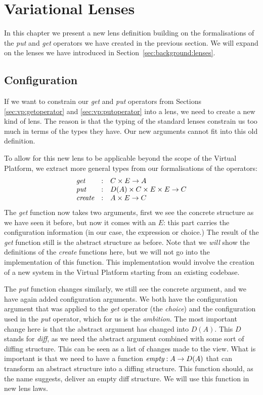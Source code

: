 \chapter{Variational Lenses}\label{sec:configlenses}
In this chapter we present a new lens definition building on the formalisations 
of the \emph{put} and \emph{get} operators we have created in the previous
section. We will expand on the lenses we have introduced in Section~\ref{sec:background:lenses}.

\section{Configuration}
If we want to constrain our \emph{get} and \emph{put} operators from
Sections \ref{sec:vp:getoperator} and \ref{sec:vp:putoperator} into a lens, we
need to create a new kind of lens. The reason is that the typing of the
standard lenses constrain us too much in terms of the types they have. Our
new arguments cannot fit into this old definition.

To allow for this new lens to be applicable beyond the scope of the Virtual
Platform, we extract more general types from our formalisations of the
operators:
\[
  \begin{array}{lll}
    \textit{get} & : & C \times E \rightarrow A \\
    \textit{put} & : & D(A) \times C \times E \times E \rightarrow C \\
    \textit{create} & : & A \times E \rightarrow C
  \end{array}
\]
The \emph{get} function now takes two arguments, first we see the concrete
structure as we have seen it before, but now it comes with an \(E\): this part
carries the configuration information (in our case, the expression or choice.)
The result of the \emph{get} function still is the abstract structure as before. Note
that we \emph{will} show the definitions of the \emph{create} functions here, 
but we will not go into the implementation of this function. This implementation
would involve the creation of a new system in the Virtual Platform starting from an
existing codebase.

The \emph{put} function changes similarly, we still see the concrete
argument, and we have again added configuration arguments. We both have the 
configuration argument that was applied to the \emph{get} operator (the
\emph{choice}) and the configuration used in the \emph{put} operator, which for
us is the \emph{ambition}. The most important change here is that the abstract
argument has changed into \(D(A)\). This \(D\) stands for \emph{diff}, as we
need the abstract argument combined with some sort of diffing structure. This
can be seen as a list of changes made to the view. What
is important is that we need to have a function
\(\textit{empty} : A \rightarrow D(A)\) that can transform an abstract
structure into a diffing structure. This function should, as the name suggests,
deliver an empty diff structure. We will use this function in new lens laws.

